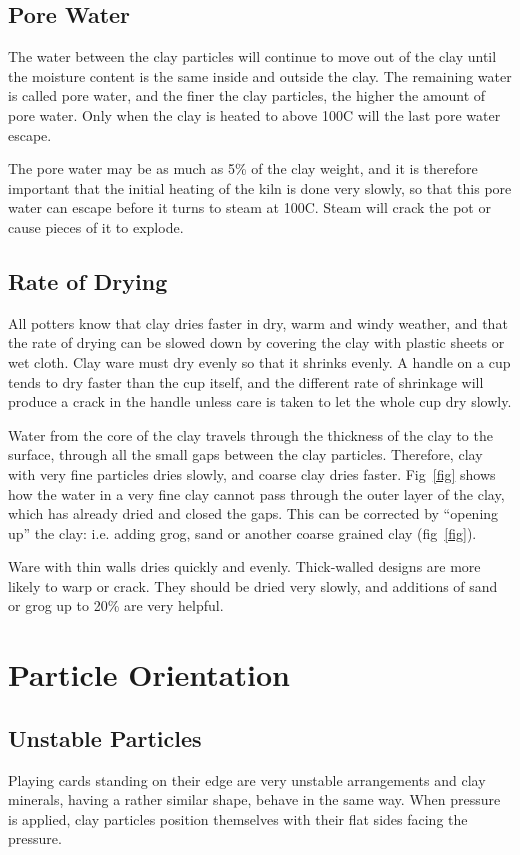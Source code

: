 \subsection{Pore Water}
The water between the clay particles will continue to move out of the clay 
until the moisture content is the same inside and outside the clay. The 
remaining water is called pore water, and the finer the clay particles, the 
higher the amount of pore water. Only when the clay is heated to above 
100\degree C will the last pore water escape.

The pore water may be as much as 5\% of the clay weight, and it is therefore 
important that the initial heating of the kiln is done very slowly, so that 
this pore water can escape before it turns to steam at 100\degree C. Steam will 
crack the pot or cause pieces of it to explode.
\subsection{Rate of Drying}
All potters know that clay dries faster in dry, warm and windy weather, and 
that the rate of drying can be slowed down by covering the clay with plastic 
sheets or wet cloth. Clay ware must dry evenly so that it shrinks evenly. A 
handle on a cup tends to dry faster than the cup itself, and the different rate 
of shrinkage will produce a crack in the handle unless care is taken to let the 
whole cup dry slowly.

Water from the core of the clay travels through the thickness of the clay to 
the surface, through all the small gaps between the clay particles. Therefore, 
clay with very fine particles dries slowly, and coarse clay dries faster. 
Fig~\ref{fig} shows how the water in a very fine clay cannot pass through the 
outer layer of the clay, which has already dried and closed the gaps. This can 
be corrected by ``opening up'' the clay: i.e. adding grog, sand or another 
coarse grained clay (fig~\ref{fig}). 

Ware with thin walls dries quickly and evenly. Thick-walled designs are more 
likely to warp or crack. They should be dried very slowly, and additions of 
sand or grog up to 20\% are very helpful.
\section{Particle Orientation}
\subsection{Unstable Particles}
Playing cards standing on their edge are very unstable arrangements and clay 
minerals, having a rather similar shape, behave in the same way. When pressure 
is applied, clay particles position themselves with their flat sides facing the 
pressure.

